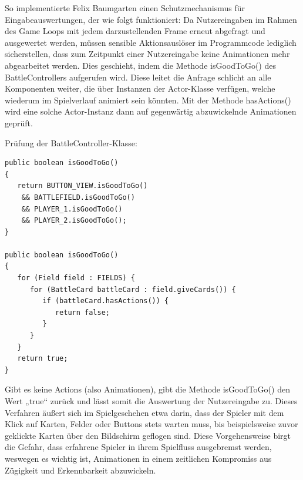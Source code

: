 So implementierte Felix Baumgarten einen Schutzmechanismus für Eingabeauswertungen, der wie folgt funktioniert: Da Nutzereingaben im Rahmen des Game Loops mit jedem darzustellenden Frame erneut abgefragt und ausgewertet werden, müssen sensible Aktionsauslöser im Programmcode lediglich sicherstellen, dass zum Zeitpunkt einer Nutzereingabe keine Animationen mehr abgearbeitet werden. Dies geschieht, indem die Methode isGoodToGo() des BattleControllers aufgerufen wird. Diese leitet die Anfrage schlicht an alle Komponenten weiter, die über Instanzen der Actor-Klasse verfügen, welche wiederum im Spielverlauf animiert sein könnten. Mit der Methode hasActions() wird eine solche Actor-Instanz dann auf gegenwärtig abzuwickelnde Animationen geprüft.

Prüfung der BattleController-Klasse:
 
\begin{lstlisting}
public boolean isGoodToGo()
{
   return BUTTON_VIEW.isGoodToGo() 
	&& BATTLEFIELD.isGoodToGo() 
	&& PLAYER_1.isGoodToGo() 
	&& PLAYER_2.isGoodToGo();
}

public boolean isGoodToGo()
{
   for (Field field : FIELDS) {
      for (BattleCard battleCard : field.giveCards()) {
         if (battleCard.hasActions()) {
            return false;
         }
      }
   }
   return true;
}
\end{lstlisting}

Gibt es keine Actions (also Animationen), gibt die Methode isGoodToGo() den Wert „true“ zurück und lässt somit die Auswertung der Nutzereingabe zu. Dieses Verfahren äußert sich im Spielgeschehen etwa darin, dass der Spieler mit dem Klick auf Karten, Felder oder Buttons stets warten muss, bis beispielsweise zuvor geklickte Karten über den Bildschirm geflogen sind.
Diese Vorgehensweise birgt die Gefahr, dass erfahrene Spieler in ihrem Spielfluss ausgebremst werden, weswegen es wichtig ist, Animationen in einem zeitlichen Kompromiss aus Zügigkeit und Erkennbarkeit abzuwickeln.

